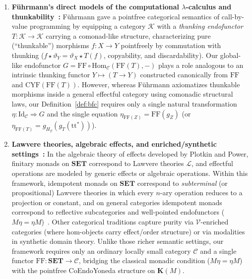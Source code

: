 \documentclass[11pt,a4paper]{article}
\theoremstyle{definition}
\theoremstyle{remark}
\newcommand{\Set}{\mathbf{SET}}
\newcommand{\Hom}{\mathrm{Hom}}
\newcommand{\Id}{\mathrm{Id}}
\newcommand{\CYF}{\mathrm{CYF}}
\newcommand{\FF}{\mathrm{FF}}
\newcommand{\K}{\mathbf{K}}
\newcommand{\ttstar}{\mathrm{tt}^*}
\begin{document}
\begin{enumerate}[label=(\arabic*),nosep]
  centrality captures commutativity of effects (and hence purity relative to non-commuting effects),
  it requires symmetric premonoidal tensor structure on $\mathcal{K}$ and still admits commutative
  effects (such as $\mathrm{Read}\;R$ or commutative $\mathrm{Write}\;W$) in the center. By contrast,
  our Basic Functional Category condition requires no monoidal or premonoidal tensor structure on
  $\mathcal{C}$, and eliminates even commutative effects such as $\mathrm{Read}\;R$ (for $|R| \ge 2$)
  and commutative $\mathrm{Write}\;W$ (for $|W| \ge 2$).
\vspace{4pt}
  \item \textbf{Führmann's direct models of the computational $\lambda$-calculus and thunkability~\cite{Fuhrmann1999}:}
  Führmann gave a pointfree categorical semantics of call-by-value programming by equipping a
  category $\mathcal{K}$ with a \emph{thunking endofunctor} $T : \mathcal{K} \to \mathcal{K}$ carrying
  a comonad-like structure, characterizing pure (``thunkable'') morphisms $f : X \to Y$ pointfreely by
  commutation with thunking ($f \star \vartheta_Y = \vartheta_X \star T(f)$, copyability, and
  discardability). Our global-like endofunctor $G = \FF \circ \Hom_{\mathcal{C}}(\FF(T), -)$ plays a
  role analogous to an intrinsic thunking functor $Y \mapsto (T \to Y)$ constructed canonically from
  $\FF$ and $\CYF(\FF(T))$. However, whereas Führmann axiomatizes thunkable morphisms inside a general
  effectful category using comonadic structural laws, our Definition~\ref{def:bfc} requires only a
  single natural transformation $\eta : \Id_{\mathcal{C}} \Rightarrow G$ and the single equation
  $\eta_{\FF(Z)} = \FF(g_Z)$ (or $\eta_{\FF(T)} = g_{H_T}(g_T(\ttstar))$).
\vspace{4pt}
  \item \textbf{Lawvere theories, algebraic effects, and enriched/synthetic settings~\cite{Lawvere1963,PlotkinPower2002,PlotkinPower2003}:}
  In the algebraic theory of effects developed by Plotkin and Power, finitary monads on $\Set$
  correspond to Lawvere theories $\mathcal{L}$, and effectful operations are modeled by generic effects
  or algebraic operations. Within this framework, idempotent monads on $\Set$ correspond to
  \emph{subterminal} (or propositional) Lawvere theories in which every $n$-ary operation reduces to a
  projection or constant, and on general categories idempotent monads correspond to reflective
  subcategories and well-pointed endofunctors ($M\eta = \eta M$)~\cite{Kelly1980,Borceux1994,nLabIdempotentMonad,nLabWellPointed}.
  Other categorical traditions capture purity via $\mathcal{V}$-enriched categories (where hom-objects
  carry effect/order structure) or via modalities in synthetic domain theory. Unlike those richer
  semantic settings, our framework requires only an ordinary locally small category $\mathcal{C}$ and a
  single functor $\FF : \Set \to \mathcal{C}$, bridging the classical monadic condition
  ($M\eta = \eta M$) with the pointfree CoEndoYoneda structure on $\K(M)$.
\end{enumerate}
\end{document}
